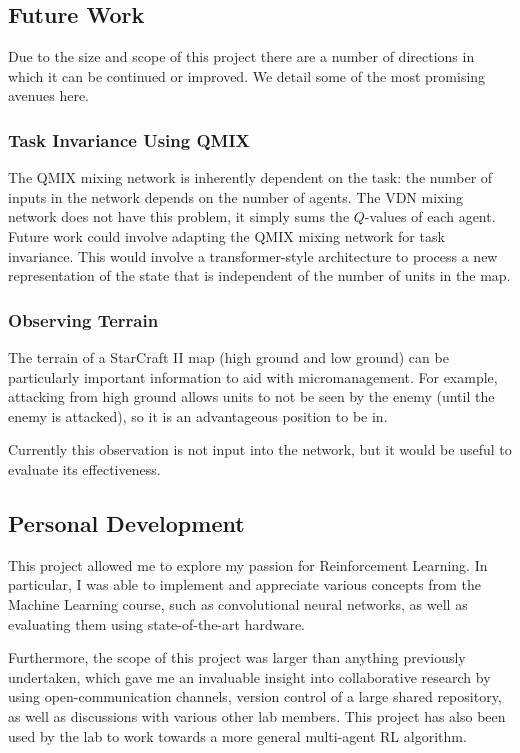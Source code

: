 \subsection{Future Work}

Due to the size and scope of this project there are a number of directions in which it can be continued or improved. We detail some of the most promising avenues here.


\subsubsection{Task Invariance Using QMIX}

The QMIX mixing network is inherently dependent on the task: the number of inputs in the network depends on the number of agents. The VDN mixing network does not have this problem, it simply sums the $Q$-values of each agent. Future work could involve adapting the QMIX mixing network for task invariance. This would involve a transformer-style architecture to process a new representation of the state that is independent of the number of units in the map.


\subsubsection{Observing Terrain}

The terrain of a StarCraft II map (high ground and low ground) can be particularly important information to aid with micromanagement. For example, attacking from high ground allows units to not be seen by the enemy (until the enemy is attacked), so it is an advantageous position to be in.

Currently this observation is not input into the network, but it would be useful to evaluate its effectiveness.


\subsection{Personal Development}
This project allowed me to explore my passion for Reinforcement Learning. In particular, I was able to implement and appreciate various concepts from the Machine Learning course, such as convolutional neural networks, as well as evaluating them using state-of-the-art hardware.

Furthermore, the scope of this project was larger than anything previously undertaken, which gave me an invaluable insight into collaborative research by using open-communication channels, version control of a large shared repository, as well as discussions with various other lab members. This project has also been used by the lab to work towards a more general multi-agent RL algorithm.